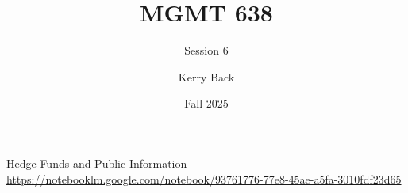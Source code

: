 \documentclass[aspectratio=169]{beamer}
\title{MGMT 638}
\subtitle{Session 6}
\author{Kerry Back}
\institute{}
\date{Fall 2025}
\begin{document}
\maketitle

\begin{frame}{Hedge Funds and Public Information}
\centering
\Large
\url{https://notebooklm.google.com/notebook/93761776-77e8-45ae-a5fa-3010fdf23d65}
\end{frame}
\end{document}
